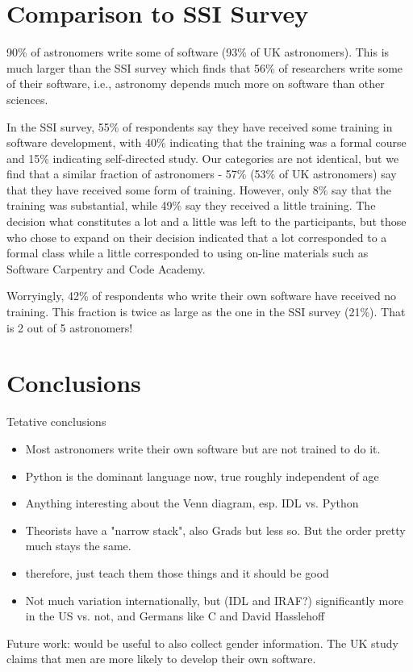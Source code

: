 \section{Comparison to SSI Survey}

90\% of astronomers write some of software (93\% of UK astronomers). This is much larger than the SSI survey which finds that 56\% of researchers write some of their software, i.e., astronomy depends much more on software than other sciences.

In the SSI survey, 55\% of respondents say they have received some training in software development, with 40\% indicating that the training was a formal course and 15\% indicating self-directed study. Our categories are not identical, but we find that a similar fraction of astronomers - 57\% (53\% of UK astronomers) say that they have received some form of training. However, only 8\% say that the training was substantial, while 49\% say they received a little training. The decision what constitutes a lot and a little was left to the participants, but those who chose to expand on their decision indicated that a lot corresponded to a formal class while a little corresponded to using on-line materials such as Software Carpentry and Code Academy.

Worryingly, 42\% of respondents who write their own software have received no training. This fraction is twice as large as the one in the SSI survey (21\%). That is 2 out of 5 astronomers! 


\section{Conclusions}

Tetative conclusions
\begin{itemize}
\item Most astronomers write their own software but are not trained to do it.
\item Python is the dominant language now, true roughly independent of age
\item Anything interesting about the Venn diagram, esp. IDL vs. Python
\item Theorists have a "narrow stack", also Grads but less so.  But the order pretty much stays the same.
\item therefore, just teach them those things and it should be good
\item Not much variation internationally, but (IDL and IRAF?) significantly more in the US vs. not, and Germans like C and David Hasslehoff
\end{itemize}

Future work: would be useful to also collect gender information. The UK study claims that men are more likely to develop their own software. 